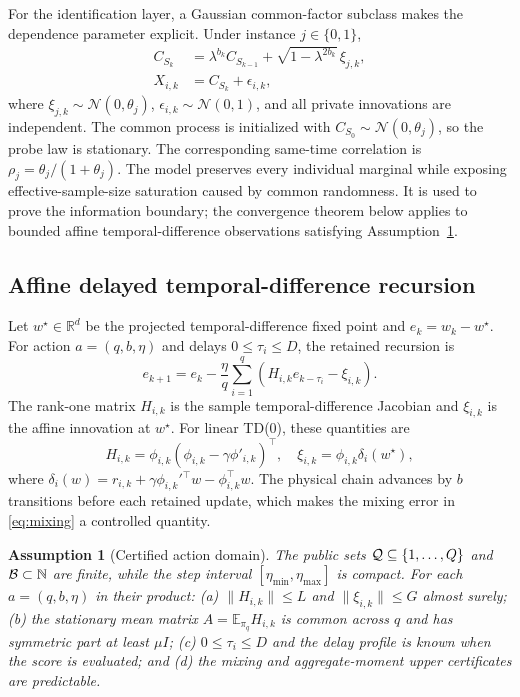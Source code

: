 \documentclass[journal]{IEEEtran}
\newtheorem{assumption}{Assumption}
\newcommand{\E}{\mathbb{E}}
\newcommand{\R}{\mathbb{R}}
\begin{document}
For the identification layer, a Gaussian common-factor subclass makes the dependence parameter explicit.
Under instance $j\in\{0,1\}$,
\begin{align}
C_{S_k}&=\lambda^{b_k}C_{S_{k-1}}+\sqrt{1-\lambda^{2b_k}}\,\xi_{j,k},\nonumber\\
X_{i,k}&=C_{S_k}+\epsilon_{i,k},
\label{eq:common-factor}
\end{align}
where $\xi_{j,k}\sim\mathcal{N}(0,\theta_j)$, $\epsilon_{i,k}\sim\mathcal{N}(0,1)$, and all private innovations are independent.
The common process is initialized with $C_{S_0}\sim\mathcal N(0,\theta_j)$, so the probe law is stationary.
The corresponding same-time correlation is $\rho_j=\theta_j/(1+\theta_j)$.
The model preserves every individual marginal while exposing effective-sample-size saturation caused by common randomness.
It is used to prove the information boundary; the convergence theorem below applies to bounded affine temporal-difference observations satisfying Assumption~\ref{ass:catalogue}.

\subsection{Affine delayed temporal-difference recursion}
Let $w^\star\in\R^d$ be the projected temporal-difference fixed point and $e_k=w_k-w^\star$.
For action $a=(q,b,\eta)$ and delays $0\le\tau_i\le D$, the retained recursion is
\begin{equation}
e_{k+1}=e_k-\frac{\eta}{q}\sum_{i=1}^{q}\left(H_{i,k}e_{k-\tau_i}-\xi_{i,k}\right).
\label{eq:affine-td}
\end{equation}
The rank-one matrix $H_{i,k}$ is the sample temporal-difference Jacobian and $\xi_{i,k}$ is the affine innovation at $w^\star$.
For linear TD(0), these quantities are
\begin{equation}
H_{i,k}=\phi_{i,k}(\phi_{i,k}-\gamma\phi'_{i,k})^\top,
\quad
\xi_{i,k}=\phi_{i,k}\delta_i(w^\star),
\label{eq:td-components}
\end{equation}
where $\delta_i(w)=r_{i,k}+\gamma\phi_{i,k}'{}^\top w-\phi_{i,k}^\top w$.
The physical chain advances by $b$ transitions before each retained update, which makes the mixing error in \eqref{eq:mixing} a controlled quantity.

\begin{assumption}[Certified action domain]
The public sets ${\cal Q}\subseteq\{1,\ldots,Q\}$ and ${\cal B}\subset\mathbb N$ are finite, while the step interval $[\eta_{\min},\eta_{\max}]$ is compact.
For each $a=(q,b,\eta)$ in their product: (a) $\|H_{i,k}\|\le L$ and $\|\xi_{i,k}\|\le G$ almost surely; (b) the stationary mean matrix $A=\E_{\pi_q}H_{i,k}$ is common across $q$ and has symmetric part at least $\mu I$; (c) $0\le\tau_i\le D$ and the delay profile is known when the score is evaluated; and (d) the mixing and aggregate-moment upper certificates are predictable.
\label{ass:catalogue}
\end{assumption}
\end{document}
